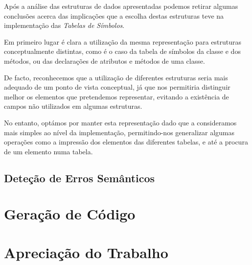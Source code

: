 \documentclass[11pt,a4paper]{article}
\begin{document}
	Após a análise das estruturas de dados apresentadas podemos retirar algumas conclusões acerca das implicações que a escolha destas estruturas teve na implementação das \emph{Tabelas de Símbolos}.
	
	Em primeiro lugar é clara a utilização da mesma representação para estruturas conceptualmente distintas, como é o caso da tabela de símbolos da classe e dos métodos, ou das declarações de atributos e métodos de uma classe.
	
	De facto, reconhecemos que a utilização de diferentes estruturas seria mais adequado de um ponto de vista conceptual, já que nos permitiria distinguir melhor os elementos que pretendemos representar, evitando a existência de campos não utilizados em algumas estruturas.
	
	No entanto, optámos por manter esta representação dado que a consideramos mais simples ao nível da implementação, permitindo-nos generalizar algumas operações como a impressão dos elementos das diferentes tabelas, e até a procura de um elemento numa tabela.
	
	\pagebreak
	
	\subsection{Deteção de Erros Semânticos}
	
	\pagebreak
	
\section{Geração de Código}

\pagebreak

\section{Apreciação do Trabalho}
\end{document}

